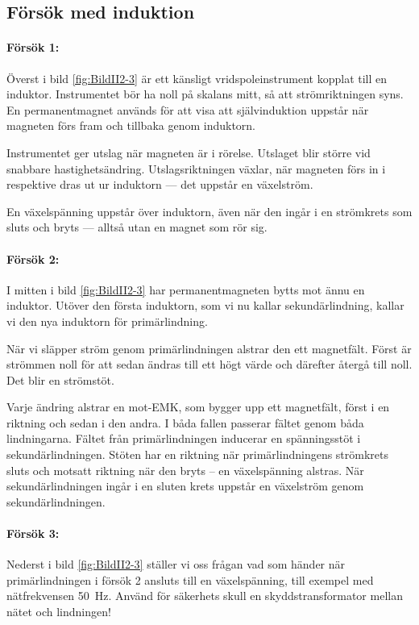 \subsection{Försök med induktion}


\paragraph{Försök 1:}
Överst i bild \ref{fig:BildII2-3} är ett känsligt vridspoleinstrument kopplat
till en induktor. Instrumentet bör ha noll på skalans mitt, så att
strömriktningen syns. En permanentmagnet används för att visa att självinduktion
uppstår när magneten förs fram och tillbaka genom induktorn.

Instrumentet ger utslag när magneten är i rörelse. Utslaget blir större vid
snabbare hastighetsändring. Utslagsriktningen växlar, när magneten förs in i
respektive dras ut ur induktorn --- det uppstår en växelström.

En växelspänning uppstår över induktorn, även när den ingår i en strömkrets som
sluts och bryts --- alltså utan en magnet som rör sig.

\paragraph{Försök 2:}
I mitten i bild \ref{fig:BildII2-3} har permanentmagneten bytts mot ännu en
induktor. Utöver den första induktorn, som vi nu kallar sekundärlindning, kallar
vi den nya induktorn för primärlindning.

När vi släpper ström genom primärlindningen alstrar den ett magnetfält. Först är
strömmen noll för att sedan ändras till ett högt värde och därefter återgå till
noll. Det blir en strömstöt.

Varje ändring alstrar en mot-EMK, som bygger upp ett magnetfält, först i en
riktning och sedan i den andra. I båda fallen passerar fältet genom båda
lindningarna. Fältet från primärlindningen inducerar en spänningsstöt i
sekundärlindningen. Stöten har en riktning när primärlindningens strömkrets
sluts och motsatt riktning när den bryts -- en växelspänning alstras. När
sekundärlindningen ingår i en sluten krets uppstår en växelström genom
sekundärlindningen.

\paragraph{Försök 3:}
Nederst i bild \ref{fig:BildII2-3} ställer vi oss frågan vad som händer när
primärlindningen i försök 2 ansluts till en växelspänning, till exempel
med nätfrekvensen \SI{50}{\hertz}.
Använd för säkerhets skull en skyddstransformator mellan nätet och lindningen!

